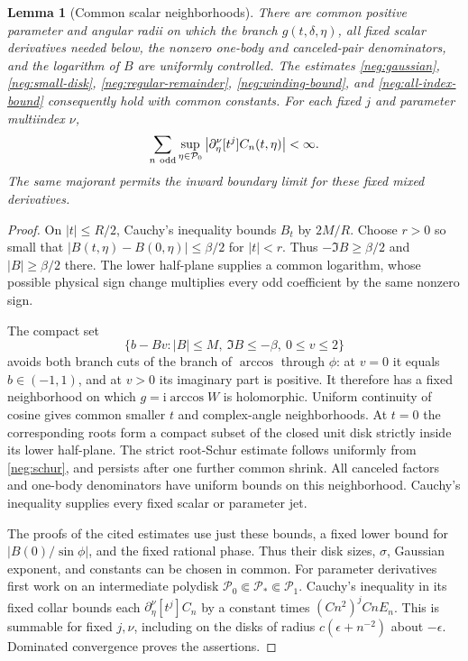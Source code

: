 \documentclass[11pt]{article}
\numberwithin{equation}{section}
\newtheorem{lemma}[theorem]{Lemma}
\theoremstyle{definition}
\newcommand{\ii}{\mathrm i}
\begin{document}
\begin{lemma}[Common scalar neighborhoods]\label{neg:family-neighborhoods}
There are common positive parameter and angular radii on which the
branch \(g(t,\delta,\eta)\), all fixed scalar derivatives needed below,
the nonzero one-body and canceled-pair denominators, and the logarithm
of \(B\) are uniformly controlled.  The estimates
\eqref{neg:gaussian}, \eqref{neg:small-disk},
\eqref{neg:regular-remainder}, \eqref{neg:winding-bound}, and
\eqref{neg:all-index-bound} consequently hold with common constants.
For each fixed \(j\) and parameter multiindex \(\nu\),
\[
 \sum_{n\ {\rm odd}}\sup_{\eta\in\mathcal P_0}
 \left|\partial_\eta^\nu[t^j]C_n(t,\eta)\right|<\infty.
\]
The same majorant permits the inward boundary limit for these fixed
mixed derivatives.
\end{lemma}
\begin{proof}
On \(|t|\le R/2\), Cauchy's inequality bounds \(B_t\) by \(2M/R\).
Choose \(r>0\) so small that \(|B(t,\eta)-B(0,\eta)|\le\beta/2\)
for \(|t|<r\).  Thus \(-\Im B\ge\beta/2\) and \(|B|\ge\beta/2\)
there.  The lower half-plane supplies a common logarithm, whose
possible physical sign change multiplies every odd coefficient by the
same nonzero sign.

The compact set
\[
 \{b-Bv: |B|\le M,\ \Im B\le-\beta,\ 0\le v\le2\}
\]
avoids both branch cuts of the branch of \(\arccos\) through \(\phi\):
at \(v=0\) it equals \(b\in(-1,1)\), and at \(v>0\) its imaginary
part is positive.  It therefore has a fixed neighborhood on which
\(g=\ii\arccos W\) is holomorphic.  Uniform continuity of cosine
gives common smaller \(t\) and complex-angle neighborhoods.
At \(t=0\) the corresponding roots form a compact subset of the
closed unit disk strictly inside its lower half-plane.  The strict
root-Schur estimate follows uniformly from \eqref{neg:schur}, and
persists after one further common shrink.  All canceled factors and
one-body denominators have uniform bounds on this neighborhood.
Cauchy's inequality supplies every fixed scalar or parameter jet.

The proofs of the cited estimates use just these bounds, a fixed
lower bound for \(|B(0)/\sin\phi|\), and the fixed rational phase.
Thus their disk sizes, \(\sigma\), Gaussian exponent, and constants
can be chosen in common.  For parameter derivatives first work on an
intermediate polydisk \(\mathcal P_0\Subset\mathcal P_*\Subset
\mathcal P_1\).  Cauchy's inequality in its fixed collar bounds each
\(\partial_\eta^\nu[t^j]C_n\) by a constant times
\((Cn^2)^j CnE_n\).  This is summable for fixed \(j,\nu\), including
on the disks of radius \(c(\epsilon+n^{-2})\) about \(-\epsilon\).
Dominated convergence proves the assertions.
\end{proof}
\end{document}
